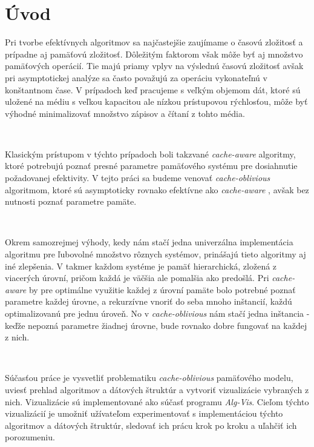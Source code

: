 \documentclass[12pt,a4paper]{article}
\begin{document}

\newcommand{\aware}{{\em cache-aware} }
\newcommand{\obliv}{{\em cache-oblivious} }

\newtheorem{lema}{Lema}

\newcommand{\bigO}{\ensuremath{\mathcal{O}}}



\section{Úvod}

Pri tvorbe efektívnych algoritmov sa najčastejšie zaujímame o časovú zložitosť a prípadne aj pamäťovú zložitosť. Dôležitým faktorom však môže byť aj množstvo pamäťových operácií. Tie majú priamy vplyv na výslednú časovú zložitosť avšak pri asymptotickej analýze sa často považujú za operáciu vykonateľnú v konštantnom čase. V prípadoch keď pracujeme s veľkým objemom dát, ktoré sú uložené na médiu s veľkou kapacitou ale nízkou prístupovou rýchlosťou, môže byť výhodné minimalizovať množstvo zápisov a čítaní z tohto média.

\

Klasickým prístupom v týchto prípadoch boli takzvané \aware algoritmy, ktoré potrebujú poznať presné parametre pamäťového systému pre dosiahnutie požadovanej efektivity. V tejto práci sa budeme venovať \obliv algoritmom, ktoré sú asymptoticky rovnako efektívne ako \aware, avšak bez nutnosti poznať parametre pamäte.

\

Okrem samozrejmej výhody, kedy nám stačí jedna univerzálna implementácia algoritmu pre ľubovolné množstvo rôznych systémov, prinášajú tieto algoritmy aj iné zlepšenia. V takmer každom systéme je pamäť hierarchická, zložená z viacerých úrovní, pričom každá je väčšia ale pomalšia ako predošlá. Pri \aware by pre optimálne využitie každej z úrovní pamäte bolo potrebné poznať parametre každej úrovne, a rekurzívne vnoriť do seba mnoho inštancií, každú optimalizovanú pre jednu úroveň. No v \obliv nám stačí jedna inštancia - keďže nepozná parametre žiadnej úrovne, bude rovnako dobre fungovať na každej z nich.

\

Súčasťou práce je vysvetliť problematiku \obliv pamäťového modelu, uviesť prehlad algoritmov a dátových štruktúr a vytvoriť vizualizácie vybraných z nich. Vizualizácie sú implementované ako súčasť programu {\em Alg-Vis}. Cieľom týchto vizualizácií je umožniť užívateľom experimentovať s implementáciou týchto algoritmov a dátových štruktúr, sledovať ich prácu krok po kroku a uľahčiť ich porozumeniu.
\end{document}
